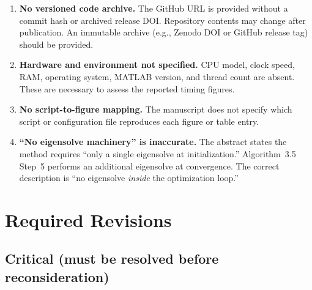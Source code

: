 \documentclass[11pt,a4paper]{article}
\begin{document}
\begin{enumerate}[leftmargin=*, label=\textbf{R\arabic*.}]

\item \textbf{No versioned code archive.}
The GitHub URL is provided without a commit hash or archived release
DOI. Repository contents may change after publication. An immutable
archive (e.g., Zenodo DOI or GitHub release tag) should be provided.

\item \textbf{Hardware and environment not specified.}
CPU model, clock speed, RAM, operating system, MATLAB version, and
thread count are absent. These are necessary to assess the reported
timing figures.

\item \textbf{No script-to-figure mapping.}
The manuscript does not specify which script or configuration file
reproduces each figure or table entry.

\item \textbf{``No eigensolve machinery'' is inaccurate.}
The abstract states the method requires ``only a single eigensolve at
initialization.'' Algorithm~3.5 Step~5 performs an additional eigensolve
at convergence. The correct description is ``no eigensolve \emph{inside}
the optimization loop.''

\end{enumerate}

\section{Required Revisions}

\subsection*{Critical (must be resolved before reconsideration)}
\end{document}
